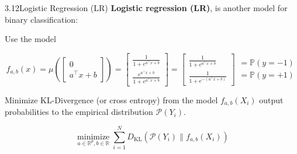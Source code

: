 \begin{frame}[allowframebreaks]

\begin{mydefinitionblock}{3.12}{Logistic Regression (LR)}
    \textbf{Logistic regression (LR)}, is another model for binary classification:

    Use the model

    $$
    f_{a, b}(x)=
    \mu\left(\left[\begin{array}{c}0 \\
    a^{\top} x+b
    \end{array}\right]\right)
    = \left[\begin{array}{c}
    \frac{1}{1+e^{a^{\top} x+b}} \\
    \frac{e^{a^{\top} x+b}}{1+e^{a^{\top} x+b}}
    \end{array}\right]=\left[\begin{array}{c}
    \frac{1}{1+e^{a^{\top} x+b}} \\
    \frac{1}{1+e^{-\left(a^{\top} x+b\right)}}
    \end{array}\right]\begin{array}{c}
    = \mathbb{P}(y=-1) \\
    = \mathbb{P}(y=+1)
    \end{array}
    $$

    Minimize KL-Divergence (or cross entropy) from the model $f_{a, b}\left(X_{i}\right)$ output probabilities to the empirical distribution $\mathcal{P}\left(Y_{i}\right)$.

    $$
    \underset{a \in \mathbb{R}^{p}, b \in \mathbb{R}}{\operatorname{minimize}} \sum_{i=1}^{N} D_{\mathrm{KL}}\left(\mathcal{P}\left(Y_{i}\right) \| f_{a, b}\left(X_{i}\right)\right)
    $$
\end{mydefinitionblock}

\end{frame}

